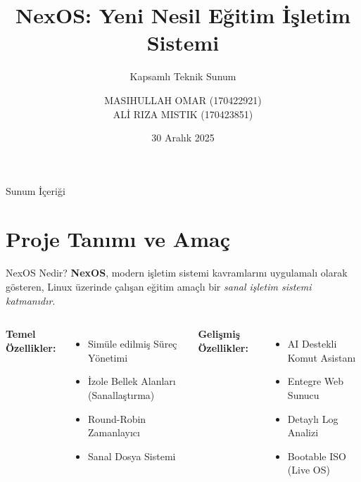 \documentclass[aspectratio=169]{beamer}
\title[NexOS]{NexOS: Yeni Nesil Eğitim İşletim Sistemi}
\subtitle{Kapsamlı Teknik Sunum}
\author[M. Omar \& A. R. Mistik]{
    MASIHULLAH OMAR (170422921)\\
    ALİ RIZA MISTIK (170423851)
}
\institute{Bilgisayar Mühendisliği}
\date{30 Aralık 2025}
\begin{document}
\begin{frame}
    \titlepage
\end{frame}

\begin{frame}{Sunum İçeriği}
    \tableofcontents
\end{frame}

\section{Proje Tanımı ve Amaç}
\begin{frame}{NexOS Nedir?}
    \textbf{NexOS}, modern işletim sistemi kavramlarını uygulamalı olarak gösteren, Linux üzerinde çalışan eğitim amaçlı bir \textit{sanal işletim sistemi katmanıdır}.
    
    \vspace{0.5cm}
    
    \begin{columns}
            \textbf{Temel Özellikler:}
            \begin{itemize}
                \item Simüle edilmiş Süreç Yönetimi
                \item İzole Bellek Alanları (Sanallaştırma)
                \item Round-Robin Zamanlayıcı
                \item Sanal Dosya Sistemi
            \end{itemize}
            
            \textbf{Gelişmiş Özellikler:}
            \begin{itemize}
                \item AI Destekli Komut Asistanı
                \item Entegre Web Sunucu
                \item Detaylı Log Analizi
                \item Bootable ISO (Live OS)
            \end{itemize}
    \end{columns}
\end{frame}
\end{document}
